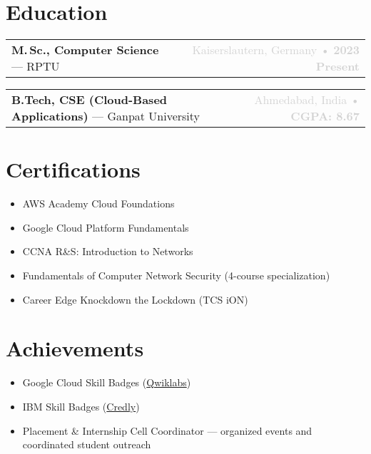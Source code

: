 \documentclass[11pt,a4paper]{article}
\newcommand{\eduheader}[4]{%
  {\small\noindent\begin{tabularx}{\textwidth}{L R}
    \textbf{#1} — #2 & \textcolor{lightgray}{#3 • #4}\\
  \end{tabularx}}\par\vspace{-2pt}}
\begin{document}
\section*{Education}
\eduheader{\textbf{M.\,Sc., Computer Science}}{RPTU}{Kaiserslautern, Germany}{\textbf{2023 \textendash{} Present}}
\eduheader{\textbf{B.Tech, CSE (Cloud-Based Applications)}}{Ganpat University}{Ahmedabad, India}{\textbf{CGPA: 8.67}}

\section*{Certifications}
\raggedcolumns%
\begin{multicols}{2}
\begin{itemize}[leftmargin=*, topsep=0pt, itemsep=0pt, parsep=0pt, partopsep=0pt]
    \item AWS Academy Cloud Foundations
    \item Google Cloud Platform Fundamentals
    \item CCNA R\&S: Introduction to Networks
    \columnbreak%
    \item Fundamentals of Computer Network Security (4-course special\-ization)
    \item Career Edge \textemdash{} Knockdown the Lockdown (TCS iON)
\end{itemize}
\end{multicols}

\section*{Achievements}
\raggedcolumns%
\begin{multicols}{2}
\begin{itemize}[leftmargin=*, topsep=0pt, itemsep=0pt, parsep=0pt, partopsep=0pt]
    \item Google Cloud Skill Badges (\href{https://www.cloudskillsboost.google/public_profiles/e4dd330f-6277-423a-b75d-1ba0dde516fc}{Qwiklabs})
    \item IBM Skill Badges (\href{https://www.credly.com/users/jaival-saija/badges#credly}{Credly})
    \columnbreak%
    \item Placement \& Internship Cell Coordinator — organized events and coordinated student outreach
\end{itemize}
\end{multicols}
\end{document}
